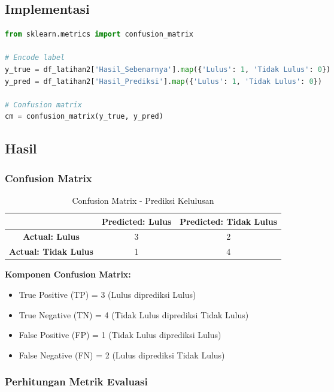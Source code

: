 \documentclass[12pt,a4paper]{article}
\begin{document}
\subsection{Implementasi}

\begin{lstlisting}[language=Python, caption=Membuat Confusion Matrix]
from sklearn.metrics import confusion_matrix

# Encode label
y_true = df_latihan2['Hasil_Sebenarnya'].map({'Lulus': 1, 'Tidak Lulus': 0})
y_pred = df_latihan2['Hasil_Prediksi'].map({'Lulus': 1, 'Tidak Lulus': 0})

# Confusion matrix
cm = confusion_matrix(y_true, y_pred)
\end{lstlisting}

\subsection{Hasil}

\subsubsection{Confusion Matrix}

\begin{table}[H]
\centering
\caption{Confusion Matrix - Prediksi Kelulusan}
\begin{tabular}{|c|c|c|}
\hline
 & \textbf{Predicted: Lulus} & \textbf{Predicted: Tidak Lulus} \\
\hline
\textbf{Actual: Lulus} & 3 & 2 \\
\hline
\textbf{Actual: Tidak Lulus} & 1 & 4 \\
\hline
\end{tabular}
\end{table}

\textbf{Komponen Confusion Matrix:}
\begin{itemize}
    \item True Positive (TP) = 3 (Lulus diprediksi Lulus)
    \item True Negative (TN) = 4 (Tidak Lulus diprediksi Tidak Lulus)
    \item False Positive (FP) = 1 (Tidak Lulus diprediksi Lulus)
    \item False Negative (FN) = 2 (Lulus diprediksi Tidak Lulus)
\end{itemize}

\subsubsection{Perhitungan Metrik Evaluasi}
\end{document}
